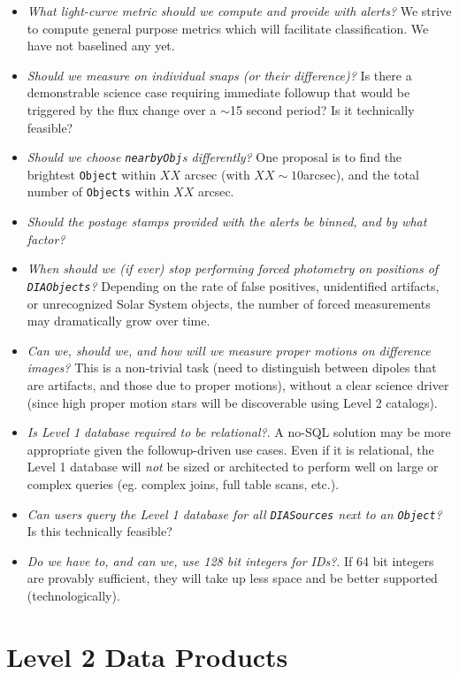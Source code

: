 \documentclass[12pt]{article}
\newcommand{\code}[1]{\texttt{#1}}
\newcommand{\DIASources}{\code{DIASources}\xspace}
\newcommand{\DIAObjects}{\code{DIAObjects}\xspace}
\newcommand{\DB}{{Level 1 database}\xspace}
\newcommand{\Object}{\code{Object}\xspace}
\newcommand{\Objects}{\code{Objects}\xspace}
\begin{document}
\begin{itemize}
    \item {\em What light-curve metric should we compute and provide with alerts?} We strive to compute general purpose metrics which will facilitate classification. We have not baselined any yet.
    \item {\em Should we measure on individual snaps (or their difference)?} Is there a demonstrable science case requiring immediate followup that would be triggered by the flux change over a $\sim$15 second period? Is it technically feasible?
    \item {\em Should we choose {\tt nearbyObj}s differently?} One proposal is to find the brightest \Object within $XX$ arcsec (with $XX \sim 10$arcsec), and the total number of \Objects within $XX$ arcsec.
    \item {\em Should the postage stamps provided with the alerts be binned, and by what factor?}
    \item {\em When should we (if ever) stop performing forced photometry on positions of \DIAObjects?} Depending on the rate of false positives, unidentified artifacts, or unrecognized Solar System objects, the number of forced measurements may dramatically grow over time.
    \item {\em Can we, should we, and how will we measure proper motions on difference images?} This is a non-trivial task (need to distinguish between dipoles that are artifacts, and those due to proper motions), without a clear science driver (since high proper motion stars will be discoverable using Level 2 catalogs).
    \item {\em Is \DB required to be relational?}. A no-SQL solution may be more appropriate given the followup-driven use cases. Even if it is relational, the Level 1 database will {\em not} be sized or architected to perform well on large or complex queries (eg. complex joins, full table scans, etc.).
    \item {\em Can users query the \DB for all \DIASources next to an \Object?} Is this technically feasible?
    \item {\em Do we have to, and can we, use 128 bit integers for IDs?}. If 64 bit integers are provably sufficient, they will take up less space and be better supported (technologically).

\end{itemize}

\clearpage

\section{Level 2 Data Products}
\end{document}

